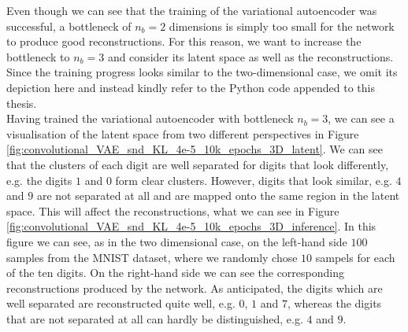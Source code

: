 Even though we can see that the training of the variational autoencoder was successful, a bottleneck of $n_b=2$ dimensions is simply too small for the network to produce good reconstructions. For this reason, we want to increase the bottleneck to $n_b=3$ and consider its latent space as well as the reconstructions. Since the training progress looks similar to the two-dimensional case, we omit its depiction here and instead kindly refer to the Python code appended to this thesis.\\
Having trained the variational autoencoder with bottleneck $n_b=3$, we can see a visualisation of the latent space from two different perspectives in Figure \ref{fig:convolutional_VAE_snd_KL_4e-5_10k_epochs_3D_latent}. We can see that the clusters of each digit are well separated for digits that look differently, e.g. the digits $1$ and $0$ form clear clusters. However, digits that look similar, e.g. $4$ and $9$ are not separated at all and are mapped onto the same region in the latent space. This will affect the reconstructions, what we can see in Figure \ref{fig:convolutional_VAE_snd_KL_4e-5_10k_epochs_3D_inference}. In this figure we can see, as in the two dimensional case, on the left-hand side $100$ samples from the MNIST dataset, where we randomly chose $10$ sampels for each of the ten digits. On the right-hand side we can see the corresponding reconstructions produced by the network. As anticipated, the digits which are well separated are reconstructed quite well, e.g. $0$, $1$ and $7$, whereas the digits that are not separated at all can hardly be distinguished, e.g. $4$ and $9$.



